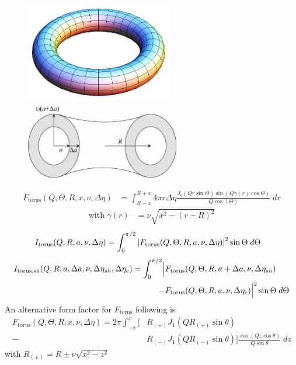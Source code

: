 \begin{figure}[htb]
\begin{center}
\includegraphics[width=0.575\textwidth]{torus.png}
\end{center}
\begin{center}
\includegraphics[width=0.6\textwidth]{torus_sh_xsect.png}
\end{center}
\caption{} \label{torus}
\end{figure}
\begin{align}
F_\text{torus}(Q,\Theta,R,x,\nu,\Delta\eta) & = \int_{R-x}^{R+x}
4\pi r \Delta\eta \frac{J_0(Qr\sin\Theta) \sin(
Q\gamma(r)\cos\Theta)}{Q\cos(\Theta)} \; dr
\end{align}
\begin{align}
\text{with } \gamma(r) &= \nu \sqrt{x^2-(r-R)^2}
\end{align}
\begin{align}
I_\text{torus}(Q,R,a,\nu,\Delta\eta) &= \int_0^{\pi/2}
\abs{F_\text{torus}(Q,\Theta,R,a,\nu,\Delta\eta)}^2 \sin\Theta  \;
d\Theta
\end{align}
\begin{align}
I_\text{torus,sh}(Q,R,a,\Delta a,\nu,\Delta\eta_{sh},\Delta\eta_c)
= \int_0^{\pi/2} \Bigl\lvert & F_\text{torus}(Q,\Theta,R,a+\Delta
a,\nu,\Delta\eta_{sh}) \\
-&F_\text{torus}(Q,\Theta,R,a,\nu,\Delta\eta_c)\Bigr\rvert^2
\sin\Theta  \;  d\Theta \nonumber
\end{align}
An alternative form factor for $F_\text{torus}$ following \cite{Forster1999} is
\begin{align}
F_\text{torus}(Q,\Theta,R,x,\nu,\Delta\eta)  = 2\pi\int_{-x}^{x}
\bigg[
 & R_{(+)} J_1(QR_{(+)}\sin\theta) \\
-& R_{(-)} J_1(QR_{(-)}\sin\theta) \bigg]
\frac{\cos(Qz\cos\theta)}{Q\sin\theta} \; dz \nonumber
\end{align}
with $R_{(\pm)} = R\pm\nu\sqrt{x^2-z^2}$

